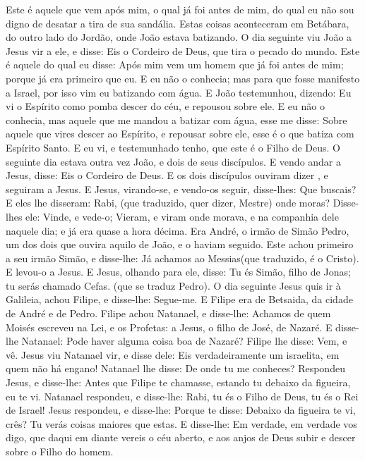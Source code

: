 {  Este é aquele que vem após mim, o qual já foi antes de mim, do qual eu não sou digno de desatar a tira de sua sandália.
  Estas coisas aconteceram em Betábara, do outro lado do Jordão, onde João estava batizando.
  O dia seguinte viu João a Jesus vir a ele, e disse: Eis o Cordeiro de Deus, que tira o pecado do mundo.
  Este é aquele do qual eu disse: Após mim vem um homem que já foi antes de mim; porque já era primeiro que eu.
  E eu não o conhecia; mas para que fosse manifesto a Israel, por isso vim eu batizando com água.
  E João testemunhou, dizendo: Eu vi o Espírito como pomba descer do céu, e repousou sobre ele.
  E eu não o conhecia, mas aquele que me mandou a batizar com água, esse me disse: Sobre aquele que vires descer ao Espírito, e repousar sobre ele, esse é o que batiza com Espírito Santo.
  E eu
{} vi, e testemunhado tenho, que este é o Filho de Deus.
  O seguinte dia estava outra vez
{} João, e dois de seus discípulos.
  E vendo
{} andar a Jesus, disse: Eis o Cordeiro de Deus.
  E os dois discípulos ouviram{} dizer
{},  e seguiram a Jesus.
  E Jesus, virando-se, e vendo-os seguir, disse-lhes: Que buscais? E eles lhe disseram: Rabi, (que traduzido, quer dizer, Mestre) onde moras?
  Disse-lhes ele: Vinde, e vede-o; Vieram, e viram onde morava, e na companhia dele naquele dia; e já era quase a hora décima.
  Era André, o irmão de Simão Pedro, um dos dois que ouvira aquilo de João, e o haviam seguido.
  Este achou primeiro a seu irmão Simão, e disse-lhe: Já achamos ao Messias(que traduzido, é o Cristo).
  E levou-o a Jesus. E Jesus, olhando para ele, disse: Tu és Simão, filho de Jonas; tu serás chamado Cefas. (que se traduz Pedro).
  O dia seguinte Jesus quis ir à Galileia, achou Filipe, e disse-lhe: Segue-me.
  E Filipe era de Betsaida, da cidade de André e de Pedro.
  Filipe achou Natanael, e disse-lhe: Achamos
{} de quem Moisés escreveu na Lei, e os Profetas: a Jesus, o filho de José, de Nazaré.
  E disse-lhe Natanael: Pode haver alguma coisa boa de Nazaré? Filipe lhe disse: Vem, e vê.
  Jesus viu Natanael vir, e disse dele: Eis verdadeiramente um israelita, em quem não há engano!
  Natanael lhe disse: De onde tu me conheces? Respondeu Jesus, e disse-lhe: Antes que Filipe te chamasse, estando tu debaixo da figueira, eu te vi.
  Natanael respondeu, e disse-lhe: Rabi, tu és o Filho de Deus, tu és o Rei de Israel!
  Jesus respondeu, e disse-lhe: Porque te disse: Debaixo da figueira te vi, crês? Tu verás coisas maiores que estas.
  E disse-lhe: Em verdade, em verdade vos digo, que daqui em diante vereis o céu aberto, e aos anjos de Deus subir e descer sobre o Filho do homem.
\par }

